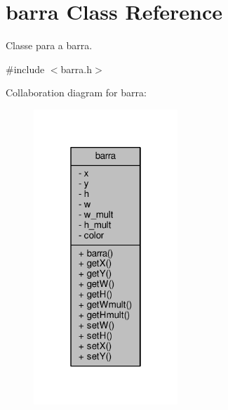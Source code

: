 \hypertarget{classbarra}{}\section{barra Class Reference}
\label{classbarra}


Classe para a barra.  




{\ttfamily \#include $<$barra.\+h$>$}



Collaboration diagram for barra\+:\nopagebreak
\begin{figure}[H]
\begin{center}
\leavevmode
\includegraphics[width=154pt]{classbarra__coll__graph}
\end{center}
\end{figure}
